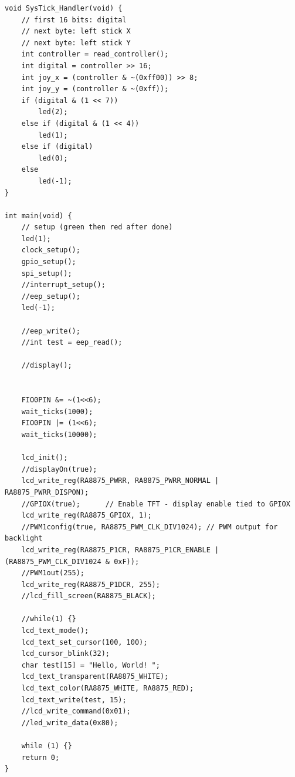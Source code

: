 \documentclass[a4paper, 12pt]{article}
\begin{document}
\begin{verbatim}
void SysTick_Handler(void) {
	// first 16 bits: digital
	// next byte: left stick X
	// next byte: left stick Y
	int controller = read_controller();
	int digital = controller >> 16;
	int joy_x = (controller & ~(0xff00)) >> 8;
	int joy_y = (controller & ~(0xff));
	if (digital & (1 << 7))
		led(2);
	else if (digital & (1 << 4))
		led(1);
	else if (digital)
		led(0);
	else
		led(-1);
}

int main(void) {
	// setup (green then red after done)
	led(1);
	clock_setup();
	gpio_setup();
	spi_setup();
	//interrupt_setup();
	//eep_setup();
	led(-1);

	//eep_write();
	//int test = eep_read();

	//display();


	FIO0PIN &= ~(1<<6);
	wait_ticks(1000);
	FIO0PIN |= (1<<6);
	wait_ticks(10000);

	lcd_init();
	//displayOn(true);
	lcd_write_reg(RA8875_PWRR, RA8875_PWRR_NORMAL | RA8875_PWRR_DISPON);
	//GPIOX(true);      // Enable TFT - display enable tied to GPIOX
	lcd_write_reg(RA8875_GPIOX, 1);
	//PWM1config(true, RA8875_PWM_CLK_DIV1024); // PWM output for backlight
	lcd_write_reg(RA8875_P1CR, RA8875_P1CR_ENABLE | (RA8875_PWM_CLK_DIV1024 & 0xF));
	//PWM1out(255);
	lcd_write_reg(RA8875_P1DCR, 255);
	//lcd_fill_screen(RA8875_BLACK);

	//while(1) {}
	lcd_text_mode();
	lcd_text_set_cursor(100, 100);
	lcd_cursor_blink(32);
	char test[15] = "Hello, World! ";
	lcd_text_transparent(RA8875_WHITE);
	lcd_text_color(RA8875_WHITE, RA8875_RED);
	lcd_text_write(test, 15);
	//lcd_write_command(0x01);
	//led_write_data(0x80);

	while (1) {}
    return 0;
}
\end{verbatim}
\end{document}
